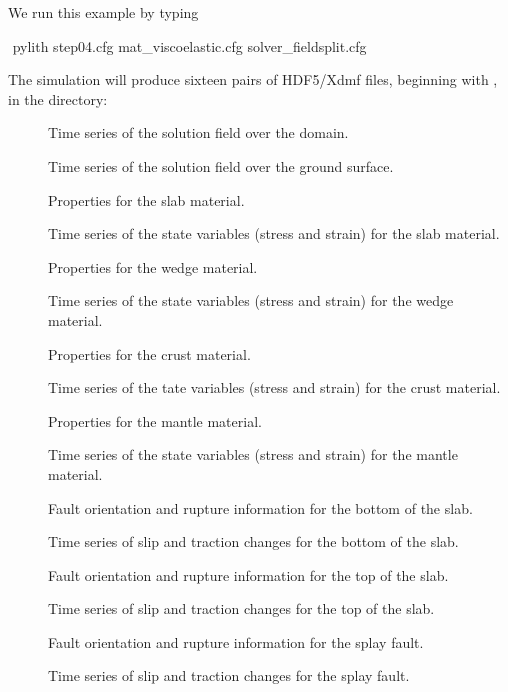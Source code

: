 We run this example by typing
\begin{shell}
$$ pylith step04.cfg mat_viscoelastic.cfg solver_fieldsplit.cfg
\end{shell}
The simulation will produce sixteen pairs of HDF5/Xdmf files,
beginning with , in the 
directory:
\begin{description}
\item[] Time series of the solution field over the domain.
\item[] Time series of the solution field over the ground surface.
\item[] Properties for
  the slab material.
\item[] Time series of the state variables (stress and strain) for the slab material.
\item[] Properties for
  the wedge material.
\item[] Time series of the state variables (stress and strain) for the wedge material.
\item[] Properties for
  the crust material.
\item[] Time series of the tate variables
  (stress and strain) for the crust material.
\item[] Properties for
  the mantle material.
\item[] Time series of the state variables
  (stress and strain) for the mantle material.
\item[] Fault orientation
  and rupture information for the bottom of the slab.
\item[] Time series of slip and
  traction changes for the bottom of the slab.
\item[] Fault orientation
  and rupture information for the top of the slab.
\item[] Time series of slip and
  traction changes for the top of the slab.
\item[] Fault orientation
  and rupture information for the splay fault.
\item[] Time series of slip and
  traction changes for the splay fault.
\end{description}

